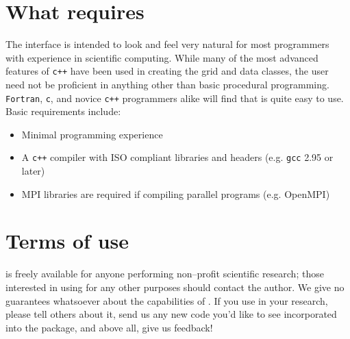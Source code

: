 \section{What \MMSP requires}
The \MMSP interface is intended to look and feel very natural for most programmers with experience in scientific computing.  While many of the most advanced features of {\tt c++} have been used in creating the grid and data classes, the user need not be proficient in anything other than basic procedural programming.  {\tt Fortran}, {\tt c}, and novice {\tt c++} programmers alike will find that \MMSP is quite easy to use.  Basic requirements include:
\begin{itemize}
\item Minimal programming experience
\item A {\tt c++} compiler with ISO compliant libraries and headers (e.g. {\tt gcc} 2.95 or later)
\item MPI libraries are required if compiling parallel programs (e.g. OpenMPI)
\end{itemize}

\section{Terms of use}
\MMSP is freely available for anyone performing non--profit scientific research; those interested in using \MMSP for any other purposes should contact the author. We give no guarantees whatsoever about the capabilities of \MMSP. If you use \MMSP in your research, please tell others about it, send us any new code you'd like to see incorporated into the package, and above all, give us feedback! 

